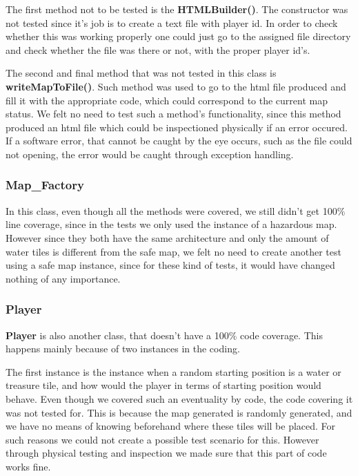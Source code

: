 \documentclass{article}
\begin{document}
\noindent
The first method not to be tested is the \textbf{HTMLBuilder()}. The constructor was not tested since it's job is to create a text file with player id. In order to check whether this was working properly one could just go to the assigned file directory and check whether the file was there or not, with the proper player id's.

\noindent
The second and final method that was not tested in this class is \textbf{writeMapToFile()}. Such method was used to go to the html file produced and fill it with the appropriate code, which could correspond to the current map status. We felt no need to test such a method's functionality, since this method produced an html file which could be inspectioned physically if an error occured. If a software error, that cannot be caught by the eye occurs, such as the file could not opening, the error would be caught through exception handling.

\subsubsection{Map\_Factory}
In this class, even though all the methods were covered, we still didn't get 100$\%$ line coverage, since in the tests we only used the instance of a hazardous map. However since they both have the same architecture and only the amount of water tiles is different from the safe map, we felt no need to create another test using a safe map instance, since for these kind of tests, it would have changed nothing of any importance.

\subsubsection{Player}
\textbf{Player} is also another class, that doesn't have a 100$\%$ code coverage. This happens mainly because of two instances in the coding.

\noindent
The first instance is the instance when a random starting position is a water or treasure tile, and how would the player in terms of starting position would behave. Even though we covered such an eventuality by code, the code covering it was not tested for. This is because the map generated is randomly generated, and we have no means of knowing beforehand where these tiles will be placed. For such reasons we could not create a possible test scenario for this. However through physical testing and inspection we made sure that this part of code works fine.
\end{document}
